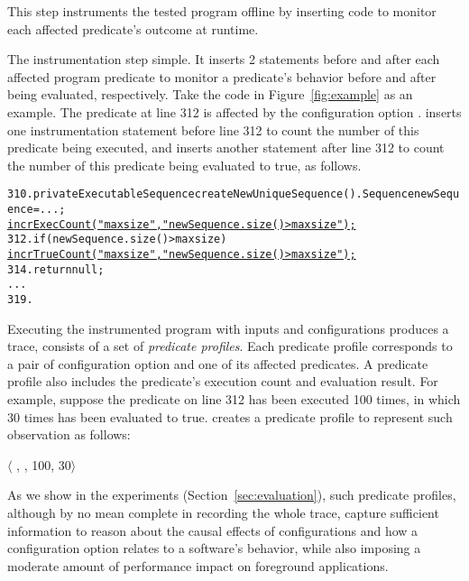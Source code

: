This step instruments the tested program offline
by inserting code to monitor each affected predicate's outcome
at runtime.

The instrumentation step simple. It inserts 2 statements
before and after each affected program predicate to monitor
a predicate's behavior before and after being evaluated, respectively. Take
the code in Figure~\ref{fig:example} as an example.
The predicate at line 312 is affected by
the configuration option . \ourtool inserts
one instrumentation statement before line 312 to
count the number of this predicate being executed, and
inserts another statement after line 312 to count the number
of this predicate being evaluated to true, as follows.


\begin{CodeOut}
\begin{alltt}
310. private ExecutableSequence createNewUniqueSequence() .   Sequence newSequence = ...; 
       \underline{incrExecCount("maxsize", "newSequence.size() > maxsize");}
312.   if (newSequence.size() > maxsize) \ttlcb
         \underline{incrTrueCount("maxsize", "newSequence.size() > maxsize");}
314.     return null;
      ...
319. \ttrcb
\end{alltt}
\end{CodeOut}


Executing the instrumented program with inputs and configurations
produces a trace, consists of a set of \textit{predicate profiles}.
Each predicate profile corresponds to a pair of configuration option
and one of its affected predicates. A predicate profile also includes
the predicate's execution count and evaluation result. For example,
suppose the predicate on line 312 has been executed 100 times, in which
30 times has been evaluated to true. \ourtool creates a predicate
profile to represent such observation as follows:

$\langle$ , , 100, 30$\rangle$ 



As we show in the experiments (Section~\ref{sec:evaluation}),
such predicate profiles, although by no mean complete in
recording the whole trace, capture
sufficient information to reason about the causal effects of configurations
and how a configuration option relates to a software's behavior, while
also imposing a moderate amount of performance impact
on foreground applications.





